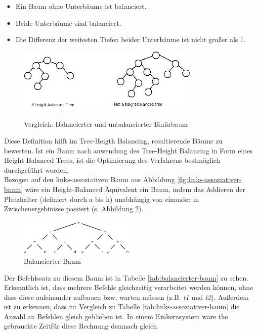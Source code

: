 \begin{itemize} 
	\item Ein Baum ohne Unterbäume ist balanciert.
	\item Beide Unterbäume sind balanciert. 
	\item Die Differenz der weitesten Tiefen beider Unterbäume ist nicht großer als 1. 
\end{itemize}

\begin{figure}
	\begin{center}
		\includegraphics[width=0.8\textwidth]{images/balanced_tree}\\
	\end{center}
	\caption{Vergleich: Balancierter und unbalancierter Binärbaum}
	\label{fig:vgl-hbt}
\end{figure}


Diese Definition hilft im Tree-Heigth Balancing, resultierende Bäume zu bewerten. Ist ein Baum nach anwendung des Tree-Height Balancing in Form eines Height-Balanced Trees, ist die Optimierung des Verfahrens bestmöglich durchgeführt worden.\\
Bezogen auf den links-assoziativen Baum aus Abbildung \ref{fig:links-assoziativer-baum} wäre ein Height-Balanced Äquivalent ein Baum, indem das Addieren der Platzhalter (definiert durch a bis h) unabhängig von einander in Zwischenergebinisse passiert (s. Abbildung \ref{fig:balancierter-baum}).\\

\begin{figure}
	\begin{center}
		\includegraphics[width=0.5\textwidth]{images/balanced}
	\end{center}
	\caption{Balancierter Baum}
	\label{fig:balancierter-baum}
\end{figure}

Der Befehlssatz zu diesem Baum ist in Tabelle \ref{tab:balancierter-baum} zu sehen. Erkenntlich ist, dass mehrere Befehle gleichzeitig verarbeitet werden können, ohne dass diese aufeinander aufbauen bzw. warten müssen (z.B. \textit{t1} und \textit{t2}). Außerdem ist zu erkennen, dass im Vergleich zu Tabelle \ref{tab:links-assoziativer-baum} die Anzahl an Befehlen gleich geblieben ist. In einem Einkernsystem wäre the gebrauchte Zeitfür diese Rechnung demnach gleich.\\

